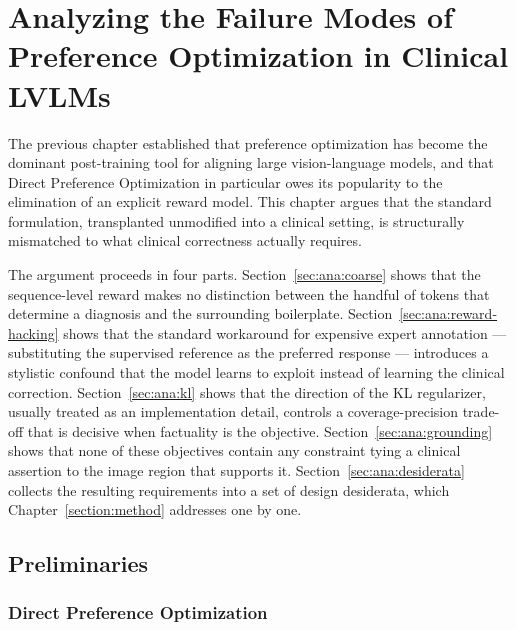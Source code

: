 \section{Analyzing the Failure Modes of Preference Optimization in Clinical LVLMs}
\label{section:analysis}

The previous chapter established that preference optimization has become the dominant post-training tool for aligning large vision-language models, and that Direct Preference Optimization in particular owes its popularity to the elimination of an explicit reward model. This chapter argues that the standard formulation, transplanted unmodified into a clinical setting, is structurally mismatched to what clinical correctness actually requires.

The argument proceeds in four parts. Section~\ref{sec:ana:coarse} shows that the sequence-level reward makes no distinction between the handful of tokens that determine a diagnosis and the surrounding boilerplate. Section~\ref{sec:ana:reward-hacking} shows that the standard workaround for expensive expert annotation --- substituting the supervised reference as the preferred response --- introduces a stylistic confound that the model learns to exploit instead of learning the clinical correction. Section~\ref{sec:ana:kl} shows that the direction of the KL regularizer, usually treated as an implementation detail, controls a coverage-precision trade-off that is decisive when factuality is the objective. Section~\ref{sec:ana:grounding} shows that none of these objectives contain any constraint tying a clinical assertion to the image region that supports it. Section~\ref{sec:ana:desiderata} collects the resulting requirements into a set of design desiderata, which Chapter~\ref{section:method} addresses one by one.

\subsection{Preliminaries}
\label{sec:ana:prelim}

\subsubsection{Direct Preference Optimization}

